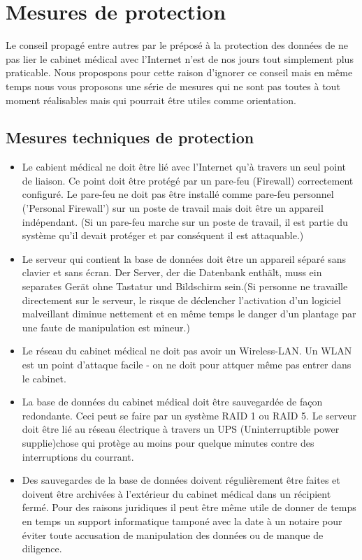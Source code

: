 \documentclass[a4paper]{scrartcl}
\begin{document}
\section{Mesures de protection}
Le conseil propagé entre autres par le préposé à la protection des données de ne pas lier le cabinet médical avec l'Internet n'est de nos jours tout simplement plus praticable. Nous propospons pour cette raison d'ignorer ce conseil mais en même temps nous vous proposons une série de mesures qui ne sont pas toutes à tout moment réalisables mais qui pourrait être utiles comme orientation.

\subsection{Mesures techniques de protection}
\begin{itemize}
\item Le cabient médical ne doit être lié avec l'Internet qu'à travers un seul point de liaison. Ce point doit être protégé par un pare-feu (Firewall) correctement configuré. Le pare-feu ne doit pas être installé comme pare-feu personnel ('Personal Firewall') sur un poste de travail mais doit être un appareil indépendant. (Si un pare-feu marche sur un poste de travail, il est partie du système qu'il devait protéger et par conséquent il est attaquable.)

\item Le serveur qui contient la base de données doit être un appareil séparé sans clavier et sans écran. Der Server, der die Datenbank enthält, muss ein separates Gerät ohne Tastatur und Bildschirm sein.(Si personne ne travaille directement sur le serveur, le risque de déclencher l'activation d'un logiciel malveillant diminue nettement et en même temps le danger d'un plantage par une faute de manipulation est mineur.)

\item Le réseau du cabinet médical ne doit pas avoir un Wireless-LAN. Un WLAN est un point d'attaque facile - on ne doit pour attquer même pas entrer dans le cabinet.

\item La base de données du cabinet médical doit être sauvegardée de façon redondante. Ceci peut se faire par un système RAID 1 ou RAID 5. Le serveur doit être lié au réseau électrique à travers un UPS (Uninterruptible power supplie)chose qui protège au moins pour quelque minutes contre des interruptions du courrant.

\item Des sauvegardes de la base de données doivent régulièrement être faites et doivent être archivées à l'extérieur du cabinet médical dans un récipient fermé. Pour des raisons juridiques il peut être même utile de donner de temps en temps  un support informatique tamponé avec la date à un notaire pour éviter toute accusation de manipulation des données ou de manque de diligence.


\end{itemize}
\end{document}
